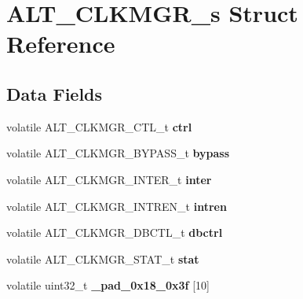 \hypertarget{structALT__CLKMGR__s}{}\section{A\+L\+T\+\_\+\+C\+L\+K\+M\+G\+R\+\_\+s Struct Reference}
\label{structALT__CLKMGR__s}
\subsection*{Data Fields}
\begin{DoxyCompactItemize}
\item 
\mbox{\label{structALT__CLKMGR__s_aeacb2622093ab8003a956b413efe95a2}} 
volatile A\+L\+T\+\_\+\+C\+L\+K\+M\+G\+R\+\_\+\+C\+T\+L\+\_\+t {\bfseries ctrl}
\item 
\mbox{\label{structALT__CLKMGR__s_a9ef0eeb1ed788488a540410bf395cdde}} 
volatile A\+L\+T\+\_\+\+C\+L\+K\+M\+G\+R\+\_\+\+B\+Y\+P\+A\+S\+S\+\_\+t {\bfseries bypass}
\item 
\mbox{\label{structALT__CLKMGR__s_a83c0e506d59d22140a4ab8fb19298530}} 
volatile A\+L\+T\+\_\+\+C\+L\+K\+M\+G\+R\+\_\+\+I\+N\+T\+E\+R\+\_\+t {\bfseries inter}
\item 
\mbox{\label{structALT__CLKMGR__s_a95e99f391b2c3c67f6354f366def75c9}} 
volatile A\+L\+T\+\_\+\+C\+L\+K\+M\+G\+R\+\_\+\+I\+N\+T\+R\+E\+N\+\_\+t {\bfseries intren}
\item 
\mbox{\label{structALT__CLKMGR__s_a164bc3857b78987c4c064fc19469c11e}} 
volatile A\+L\+T\+\_\+\+C\+L\+K\+M\+G\+R\+\_\+\+D\+B\+C\+T\+L\+\_\+t {\bfseries dbctrl}
\item 
\mbox{\label{structALT__CLKMGR__s_a0f5fccf2e8663fc17705bb3c3e5a02c0}} 
volatile A\+L\+T\+\_\+\+C\+L\+K\+M\+G\+R\+\_\+\+S\+T\+A\+T\+\_\+t {\bfseries stat}
\item 
\mbox{\label{structALT__CLKMGR__s_a6715e4715f94172d7eedc1c718aa4ae4}} 
volatile uint32\+\_\+t {\bfseries \+\_\+pad\+\_\+0x18\+\_\+0x3f} \mbox{[}10\mbox{]}
\item 
\mbox{\label{structALT__CLKMGR__s_a8a8c7c8bf270da0dd4e1f9bc35ac3e78}} 

\end{DoxyCompactItemize}

